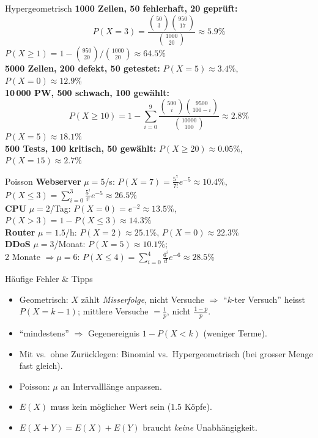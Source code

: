\documentclass[a4paper, fontsize=7pt]{scrartcl}
\begin{document}
\begin{subbox}{Hypergeometrisch}
\textbf{1000 Zeilen, 50 fehlerhaft, 20 geprüft:}
$$P(X{=}3) = \frac{\binom{50}{3}\binom{950}{17}}{\binom{1000}{20}}
\approx 5.9\%$$
$P(X \ge 1) = 1 - \binom{950}{20} / \binom{1000}{20} \approx 64.5\%$\\
\textbf{5000 Zellen, 200 defekt, 50 getestet:}
$P(X{=}5) \approx 3.4\%$, $P(X{=}0) \approx 12.9\%$\\
\textbf{10\,000 PW, 500 schwach, 100 gewählt:}
$$P(X \ge 10) = 1 - \sum_{i=0}^{9}
\frac{\binom{500}{i}\binom{9500}{100-i}}{\binom{10000}{100}} \approx 2.8\%$$
$P(X{=}5) \approx 18.1\%$\\
\textbf{500 Tests, 100 kritisch, 50 gewählt:}
$P(X \ge 20) \approx 0.05\%$, $P(X{=}15) \approx 2.7\%$
\end{subbox}

\begin{subbox}{Poisson}
\textbf{Webserver} $\mu = 5$/s:
$P(X{=}7) = \frac{5^7}{7!} e^{-5} \approx 10.4\%$,\\
$P(X \le 3) = \sum_{i=0}^{3} \frac{5^i}{i!} e^{-5} \approx 26.5\%$\\
\textbf{CPU} $\mu = 2$/Tag: $P(X{=}0) = e^{-2} \approx 13.5\%$,
$P(X > 3) = 1 - P(X \le 3) \approx 14.3\%$\\
\textbf{Router} $\mu = 1.5$/h: $P(X{=}2) \approx 25.1\%$,
$P(X{=}0) \approx 22.3\%$\\
\textbf{DDoS} $\mu = 3$/Monat: $P(X{=}5) \approx 10.1\%$;\\
2 Monate $\Rightarrow \mu = 6$:
$P(X \le 4) = \sum_{i=0}^{4} \frac{6^i}{i!} e^{-6} \approx 28.5\%$
\end{subbox}

\begin{subbox}{Häufige Fehler \& Tipps}
\begin{itemize}
    \item Geometrisch: $X$ zählt \emph{Misserfolge}, nicht Versuche
          $\Rightarrow$ ``$k$-ter Versuch'' heisst $P(X = k-1)$;
          mittlere Versuche $= \frac{1}{p}$, nicht $\frac{1-p}{p}$.
    \item ``mindestens'' $\Rightarrow$ Gegenereignis
          $1 - P(X < k)$ (weniger Terme).
    \item Mit vs.\ ohne Zurücklegen: Binomial vs.\ Hypergeometrisch
          (bei grosser Menge fast gleich).
    \item Poisson: $\mu$ an Intervalllänge anpassen.
    \item $E(X)$ muss kein möglicher Wert sein ($1.5$ Köpfe).
    \item $E(X + Y) = E(X) + E(Y)$ braucht \emph{keine} Unabhängigkeit.
\end{itemize}
\end{subbox}
\end{document}
